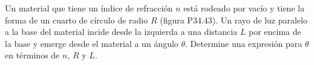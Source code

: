\item Un material que tiene un índice de refracción $n$ está rodeado por vacío y tiene la forma de un cuarto de círculo de radio $R$ (figura P34.43). Un rayo de luz paralelo a la base del material incide desde la izquierda a una distancia $L$ por encima de la base y emerge desde el material a un ángulo $\theta$. Determine una expresión para $\theta$ en términos de $n$, $R$ y $L$.